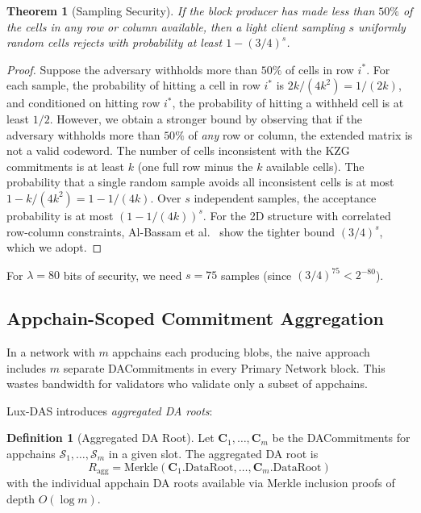 \documentclass[11pt,a4paper]{article}
\theoremstyle{plain}
\newtheorem{theorem}{Theorem}[section]
\theoremstyle{definition}
\newtheorem{definition}{Definition}[section]
\theoremstyle{remark}
\begin{document}
\begin{theorem}[Sampling Security]
\label{thm:sampling-security}
If the block producer has made less than $50\%$ of the cells in any row or column available,
then a light client sampling $s$ uniformly random cells rejects with probability at least
$1 - (3/4)^s$.
\end{theorem}

\begin{proof}
Suppose the adversary withholds more than $50\%$ of cells in row $i^*$. For each sample,
the probability of hitting a cell in row $i^*$ is $2k / (4k^2) = 1/(2k)$, and conditioned
on hitting row $i^*$, the probability of hitting a withheld cell is at least $1/2$. However,
we obtain a stronger bound by observing that if the adversary withholds more than $50\%$ of
\emph{any} row or column, the extended matrix is not a valid codeword. The number of cells
inconsistent with the KZG commitments is at least $k$ (one full row minus the $k$ available
cells). The probability that a single random sample avoids all inconsistent cells is at most
$1 - k/(4k^2) = 1 - 1/(4k)$. Over $s$ independent samples, the acceptance probability is
at most $(1 - 1/(4k))^s$. For the 2D structure with correlated row-column constraints, Al-Bassam
et al.~\cite{albassam2018fraud} show the tighter bound $(3/4)^s$, which we adopt.
\end{proof}

For $\lambda = 80$ bits of security, we need $s = 75$ samples (since $(3/4)^{75} < 2^{-80}$).

\subsection{Appchain-Scoped Commitment Aggregation}
\label{sec:protocol:aggregation}

In a network with $m$ appchains each producing blobs, the naive approach includes $m$ separate
DACommitments in every Primary Network block. This wastes bandwidth for validators who validate
only a subset of appchains.

Lux-DAS introduces \emph{aggregated DA roots}:

\begin{definition}[Aggregated DA Root]
Let $\mathbf{C}_1, \ldots, \mathbf{C}_m$ be the DACommitments for appchains
$\mathcal{S}_1, \ldots, \mathcal{S}_m$ in a given slot. The aggregated DA root is
\[
    R_{\text{agg}} = \text{Merkle}(\mathbf{C}_1.\text{DataRoot}, \ldots, \mathbf{C}_m.\text{DataRoot})
\]
with the individual appchain DA roots available via Merkle inclusion proofs of depth
$O(\log m)$.
\end{definition}
\end{document}
